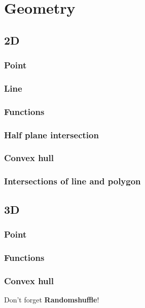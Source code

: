\section{Geometry}
\subsection{2D}
\subsubsection{Point}

\subsubsection{Line}

\subsubsection{Functions}

\subsubsection{Half plane intersection}

\subsubsection{Convex hull}

\subsubsection{Intersections of line and polygon}



\subsection{3D}
\subsubsection{Point}

\subsubsection{Functions}

\subsubsection{Convex hull}
Don't forget \textbf{Randomshuffle}!



